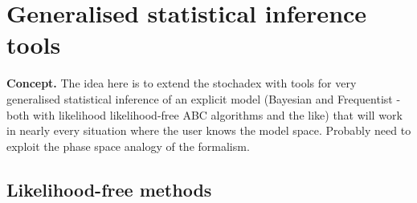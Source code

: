 \chapter{\sffamily Generalised statistical inference tools}

{\bfseries\sffamily Concept.} The idea here is to extend the stochadex with tools for very generalised statistical inference of an explicit model (Bayesian and Frequentist - both with likelihood likelihood-free ABC algorithms and the like) that will work in nearly every situation where the user knows the model space. Probably need to exploit the phase space analogy of the formalism.

\section{\sffamily Likelihood-free methods}